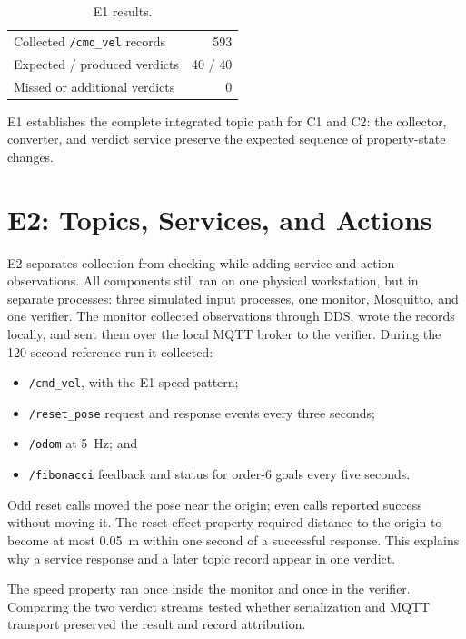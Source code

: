 \begin{table}[htbp]
\centering
\caption{E1 results.}
\begin{tabular}{lr}
\toprule
Collected \texttt{/cmd\_vel} records & 593\\
Expected / produced verdicts & 40 / 40\\
Missed or additional verdicts & 0\\
\bottomrule
\end{tabular}
\end{table}

E1 establishes the complete integrated topic path for C1 and C2: the
collector, converter, and verdict service preserve the expected sequence of
property-state changes.

\section{E2: Topics, Services, and Actions}

E2 separates collection from checking while adding service and action
observations. All components still ran on one physical workstation, but in
separate processes: three simulated input processes, one monitor,
Mosquitto, and one verifier. The monitor collected observations through DDS,
wrote the records locally, and sent them over the local MQTT broker to the
verifier. During the 120-second reference run it collected:

\begin{itemize}
  \item \texttt{/cmd\_vel}, with the E1 speed pattern;
  \item \texttt{/reset\_pose} request and response events every three seconds;
  \item \texttt{/odom} at 5~Hz; and
  \item \texttt{/fibonacci} feedback and status for order-6 goals every five
  seconds.
\end{itemize}

Odd reset calls moved the pose near the origin; even calls
reported success without moving it. The reset-effect property required distance
to the origin to become at most 0.05~m within one second of a successful
response. This explains why a service response and a later topic record appear
in one verdict.

The speed property ran once inside the monitor and once in the verifier.
Comparing the two verdict streams tested whether serialization and MQTT
transport preserved the result and record attribution.

